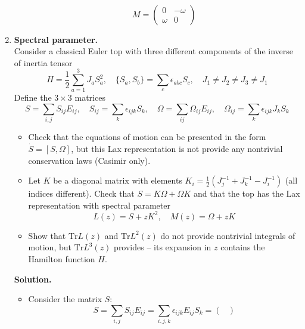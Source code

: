 \documentclass[12pt]{article}
\theoremstyle{definition}
\begin{document}
\begin{enumerate}
\begin{itemize}
\begin{multline}
        \end{multline}
        \begin{equation}
            \boxed{M=\begin{pmatrix}
                0 & -\omega\\
                \omega & 0
            \end{pmatrix}}
        \end{equation}
    \end{itemize}
    \item \textbf{Spectral parameter.}\\
    Consider a classical Euler top with three different components of the inverse of inertia tensor
    \begin{equation}
        H=\frac{1}{2}\sum\limits_{a=1}^3J_aS^2_a,\quad\{S_a,S_b\}=\sum\limits_c\epsilon_{abc}S_c,\quad J_1\neq J_2\neq J_3\neq J_1
    \end{equation}
    Define the $3\times3$ matrices
    \begin{equation}
        S=\sum\limits_{i,j}S_{ij}E_{ij},\quad S_{ij}=\sum\limits_k\epsilon_{ijk}S_k,\quad\Omega=\sum\limits_{ij}\Omega_{ij}E_{ij},\quad\Omega_{ij}=\sum\limits_k\epsilon_{ijk}J_kS_k
    \end{equation}
    \begin{itemize}
        \item Check that the equations of motion can be presented in the form $\dot{S}=[S,\Omega]$, but this Lax representation is not provide any nontrivial conservation laws (Casimir only).
        \item Let $K$ be a diagonal matrix with elements $K_i = \frac{1}{2}(J^{-1}_j + J^{-1}_k-J^{-1}_i)$ (all indices different). Check that $S = K\Omega + \Omega K$ and that the top has the Lax representation with spectral parameter
        \begin{equation}
            L(z)=S+zK^2,\quad M(z)=\Omega+zK
        \end{equation}
        \item Show that $\text{Tr}L(z)$ and $\text{Tr}L^2(z)$ do not provide nontrivial integrals of motion, but $\text{Tr}L^3(z)$ provides -- its expansion in $z$ contains the Hamilton function $H$.
    \end{itemize}
    \textbf{Solution.}
    \begin{itemize}
        \item Consider the matrix $S$:
        \begin{equation}
            S=\sum\limits_{i,j}S_{ij}E_{ij}=\sum\limits_{i,j,k}\epsilon_{ijk}E_{ij}S_k=\begin{pmatrix}

\end{pmatrix}
\end{equation}
\end{itemize}
\end{enumerate}
\end{document}

